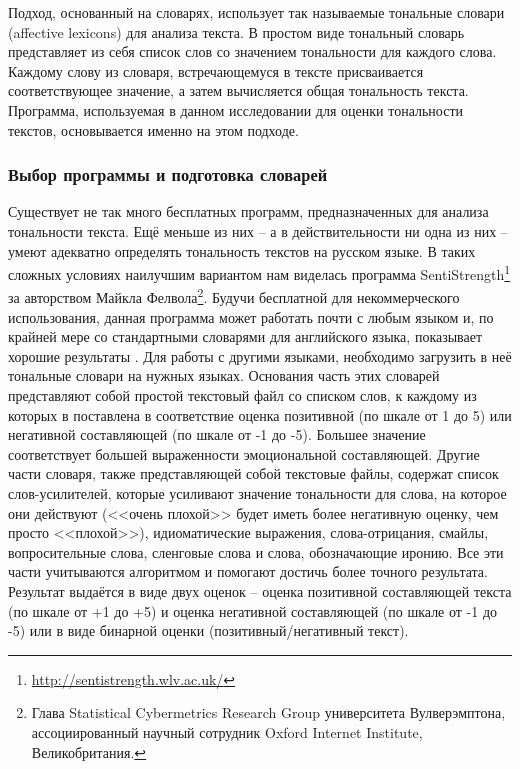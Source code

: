Подход, основанный на словарях, использует так называемые тональные словари (affective lexicons) для анализа текста. В простом виде тональный словарь представляет из себя список слов со значением тональности для каждого слова. Каждому слову из словаря, встречающемуся в тексте присваивается соответствующее значение, а затем вычисляется общая тональность текста. Программа, используемая в данном исследовании для оценки тональности текстов, основывается именно на этом подходе.

\subsubsection{Выбор программы и подготовка словарей}
Существует не так много бесплатных программ, предназначенных для анализа тональности текста. Ещё меньше из них -- а в действительности ни одна из них -- умеют адекватно определять тональность текстов на русском языке. В таких сложных условиях наилучшим вариантом нам виделась программа SentiStrength\footnote{\href{http://sentistrength.wlv.ac.uk/ }{http://sentistrength.wlv.ac.uk/}} за авторством Майкла Фелвола\footnote{Глава Statistical Cybermetrics Research Group университета Вулверэмптона, ассоциированный научный сотрудник Oxford Internet Institute, Великобритания.}. Будучи бесплатной для некоммерческого использования, данная программа может работать почти с любым языком и, по крайней мере со стандартными словарями для английского языка, показывает хорошие результаты \cite{SentiStrength}. Для работы с другими языками, необходимо загрузить в неё тональные словари на нужных языках. Основания часть этих словарей представляют собой простой текстовый файл со списком слов, к каждому из которых в поставлена в соответствие оценка позитивной (по шкале от 1 до 5) или негативной составляющей (по шкале от -1 до -5). Большее значение соответствует большей выраженности эмоциональной составляющей. Другие части словаря, также представляющей собой текстовые файлы, содержат список слов-усилителей, которые усиливают значение тональности для слова, на которое они действуют (<<очень плохой>> будет иметь более негативную оценку, чем просто <<плохой>>), идиоматические выражения, слова-отрицания, смайлы, вопросительные слова, сленговые слова и слова, обозначающие иронию. Все эти части учитываются алгоритмом и помогают достичь более точного результата. Результат выдаётся в виде двух оценок – оценка позитивной составляющей текста (по шкале от +1 до +5) и оценка негативной составляющей (по шкале от -1 до -5) или в виде бинарной оценки (позитивный/негативный текст).

